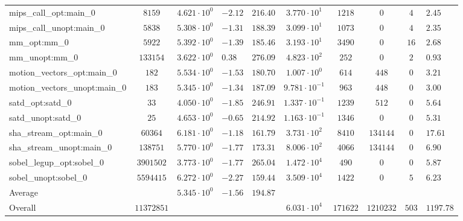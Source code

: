 \begin{tabular}{|l|c|HHc|c|c|c|cH|}
mips\_call\_opt:main\_0                         & $ 8159     $ & $ 4.621 \cdot 10^{0} $ & $ -2.12 $ & $ 216.40 $ & $ 3.770 \cdot 10^{1}  $ & $ 1218   $ & $ 0       $ & $ 4   $ & $ 2.45    $ \\
mips\_call\_unopt:main\_0                       & $ 5838     $ & $ 5.308 \cdot 10^{0} $ & $ -1.31 $ & $ 188.39 $ & $ 3.099 \cdot 10^{1}  $ & $ 1073   $ & $ 0       $ & $ 4   $ & $ 2.35    $ \\
mm\_opt:mm\_0                                   & $ 5922     $ & $ 5.392 \cdot 10^{0} $ & $ -1.39 $ & $ 185.46 $ & $ 3.193 \cdot 10^{1}  $ & $ 3490   $ & $ 0       $ & $ 16  $ & $ 2.68    $ \\
mm\_unopt:mm\_0                                 & $ 133154   $ & $ 3.622 \cdot 10^{0} $ & $ 0.38  $ & $ 276.09 $ & $ 4.823 \cdot 10^{2}  $ & $ 252    $ & $ 0       $ & $ 2   $ & $ 0.93    $ \\
motion\_vectors\_opt:main\_0                    & $ 182      $ & $ 5.534 \cdot 10^{0} $ & $ -1.53 $ & $ 180.70 $ & $ 1.007 \cdot 10^{0}  $ & $ 614    $ & $ 448     $ & $ 0   $ & $ 3.21    $ \\
motion\_vectors\_unopt:main\_0                  & $ 183      $ & $ 5.345 \cdot 10^{0} $ & $ -1.34 $ & $ 187.09 $ & $ 9.781 \cdot 10^{-1} $ & $ 963    $ & $ 448     $ & $ 0   $ & $ 3.00    $ \\
satd\_opt:satd\_0                               & $ 33       $ & $ 4.050 \cdot 10^{0} $ & $ -1.85 $ & $ 246.91 $ & $ 1.337 \cdot 10^{-1} $ & $ 1239   $ & $ 512     $ & $ 0   $ & $ 5.64    $ \\
satd\_unopt:satd\_0                             & $ 25       $ & $ 4.653 \cdot 10^{0} $ & $ -0.65 $ & $ 214.92 $ & $ 1.163 \cdot 10^{-1} $ & $ 1346   $ & $ 0       $ & $ 0   $ & $ 5.31    $ \\
sha\_stream\_opt:main\_0                        & $ 60364    $ & $ 6.181 \cdot 10^{0} $ & $ -1.18 $ & $ 161.79 $ & $ 3.731 \cdot 10^{2}  $ & $ 8410   $ & $ 134144  $ & $ 0   $ & $ 17.61   $ \\
sha\_stream\_unopt:main\_0                      & $ 138751   $ & $ 5.770 \cdot 10^{0} $ & $ -1.77 $ & $ 173.31 $ & $ 8.006 \cdot 10^{2}  $ & $ 4066   $ & $ 134144  $ & $ 0   $ & $ 6.90    $ \\
sobel\_legup\_opt:sobel\_0                      & $ 3901502  $ & $ 3.773 \cdot 10^{0} $ & $ -1.77 $ & $ 265.04 $ & $ 1.472 \cdot 10^{4}  $ & $ 490    $ & $ 0       $ & $ 0   $ & $ 5.87    $ \\
sobel\_unopt:sobel\_0                           & $ 5594415  $ & $ 6.272 \cdot 10^{0} $ & $ -2.27 $ & $ 159.44 $ & $ 3.509 \cdot 10^{4}  $ & $ 1422   $ & $ 0       $ & $ 5   $ & $ 6.23    $ \\
\hline
Average                                         & $          $ & $ 5.345 \cdot 10^{0} $ & $ -1.56 $ & $ 194.87 $ & $                     $ & $        $ & $         $ & $     $ & $         $ \\
\hline
Overall                                         & $ 11372851 $ & $                    $ & $       $ & $        $ & $ 6.031 \cdot 10^{4}  $ & $ 171622 $ & $ 1210232 $ & $ 503 $ & $ 1197.78 $ \\
\hline
\end{tabular}

